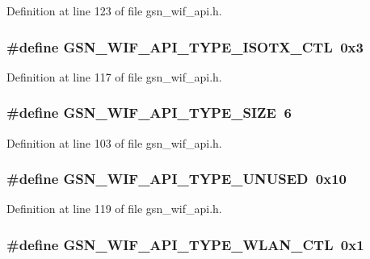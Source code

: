 Definition at line 123 of file gsn\_\-wif\_\-api.h.

\hypertarget{a00606_ac0be4ec4d6df42203ffe9726642c57c3}{
\subsubsection[{GSN\_\-WIF\_\-API\_\-TYPE\_\-ISOTX\_\-CTL}]{\setlength{\rightskip}{0pt plus 5cm}\#define GSN\_\-WIF\_\-API\_\-TYPE\_\-ISOTX\_\-CTL~0x3}}
\label{a00606_ac0be4ec4d6df42203ffe9726642c57c3}


Definition at line 117 of file gsn\_\-wif\_\-api.h.

\hypertarget{a00606_ad352ae019596522d3c81180b30376724}{
\subsubsection[{GSN\_\-WIF\_\-API\_\-TYPE\_\-SIZE}]{\setlength{\rightskip}{0pt plus 5cm}\#define GSN\_\-WIF\_\-API\_\-TYPE\_\-SIZE~6}}
\label{a00606_ad352ae019596522d3c81180b30376724}


Definition at line 103 of file gsn\_\-wif\_\-api.h.

\hypertarget{a00606_a7feac063dca4c720cff1a1d4c90386c5}{
\subsubsection[{GSN\_\-WIF\_\-API\_\-TYPE\_\-UNUSED}]{\setlength{\rightskip}{0pt plus 5cm}\#define GSN\_\-WIF\_\-API\_\-TYPE\_\-UNUSED~0x10}}
\label{a00606_a7feac063dca4c720cff1a1d4c90386c5}


Definition at line 119 of file gsn\_\-wif\_\-api.h.

\hypertarget{a00606_a98e877f872668c98c0704efa914d7d17}{
\subsubsection[{GSN\_\-WIF\_\-API\_\-TYPE\_\-WLAN\_\-CTL}]{\setlength{\rightskip}{0pt plus 5cm}\#define GSN\_\-WIF\_\-API\_\-TYPE\_\-WLAN\_\-CTL~0x1}}
\label{a00606_a98e877f872668c98c0704efa914d7d17}


